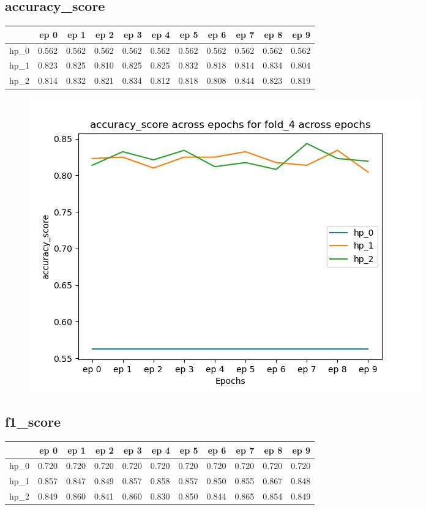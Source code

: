 \documentclass{article}
\begin{document}
\subsection{accuracy\_score}
\begin{tabular}{lrrrrrrrrrr}
\toprule
{} &   ep 0 &   ep 1 &   ep 2 &   ep 3 &   ep 4 &   ep 5 &   ep 6 &   ep 7 &   ep 8 &   ep 9 \\
\midrule
hp\_0 &  0.562 &  0.562 &  0.562 &  0.562 &  0.562 &  0.562 &  0.562 &  0.562 &  0.562 &  0.562 \\
hp\_1 &  0.823 &  0.825 &  0.810 &  0.825 &  0.825 &  0.832 &  0.818 &  0.814 &  0.834 &  0.804 \\
hp\_2 &  0.814 &  0.832 &  0.821 &  0.834 &  0.812 &  0.818 &  0.808 &  0.844 &  0.823 &  0.819 \\
\bottomrule
\end{tabular}

\begin{figure}[H]
\includegraphics[scale = 0.75]{fold_4/accuracy_score}
\end{figure}
\subsection{f1\_score}
\begin{tabular}{lrrrrrrrrrr}
\toprule
{} &   ep 0 &   ep 1 &   ep 2 &   ep 3 &   ep 4 &   ep 5 &   ep 6 &   ep 7 &   ep 8 &   ep 9 \\
\midrule
hp\_0 &  0.720 &  0.720 &  0.720 &  0.720 &  0.720 &  0.720 &  0.720 &  0.720 &  0.720 &  0.720 \\
hp\_1 &  0.857 &  0.847 &  0.849 &  0.857 &  0.858 &  0.857 &  0.850 &  0.855 &  0.867 &  0.848 \\
hp\_2 &  0.849 &  0.860 &  0.841 &  0.860 &  0.830 &  0.850 &  0.844 &  0.865 &  0.854 &  0.849 \\
\bottomrule
\end{tabular}
\end{document}

